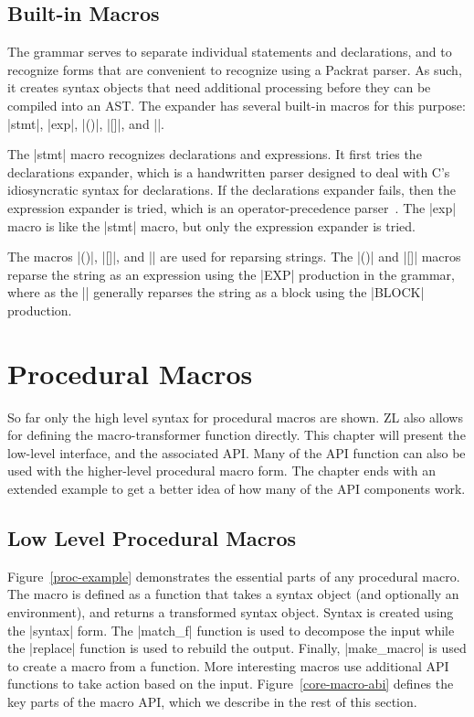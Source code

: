 \section{Built-in Macros}
\label{built-in}

The grammar serves to separate individual statements and declarations,
and to recognize forms that are convenient to recognize using a
Packrat parser.  As such, it creates syntax objects that need
additional processing before they can be compiled into an AST.  The
expander has several built-in macros for this purpose: |stmt|,
|exp|, |()|, |[]|, and |{}|.

The |stmt| macro recognizes declarations and expressions.  It first tries the
declarations expander, which is a handwritten parser designed to
deal with C's idiosyncratic syntax for declarations.  If the
declarations expander fails, then the expression expander is tried,
which is an operator-precedence parser~\cite{opp}.  
The |exp| macro is like the |stmt| macro, but only the expression
expander is tried.

The macros |()|, |[]|, and |{}| are used for reparsing
strings.  The |()| and |[]| macros reparse the string as an
expression using the |EXP| production in the grammar, where as the
|{}| generally reparses the string as a block using the |BLOCK|
production.

\chapter{Procedural Macros}
\label{proc-macros}

So far only the high level syntax for procedural macros are shown.  ZL
also allows for defining the macro-transformer function directly.
This chapter will present the low-level interface, and the associated
API.  Many of the API function can also be used with the higher-level
procedural macro form.  The chapter ends with an extended example to
get a better idea of how many of the API components work.

\section{Low Level Procedural Macros}
\label{low-level-proc}

Figure~\ref{proc-example} demonstrates the essential parts of any
procedural macro.  The macro is defined as a function that takes a
syntax object (and optionally an environment), and returns a
transformed syntax object.  Syntax is created using the |syntax| form.
The |match_f| function is used to decompose the input while the
|replace| function is used to rebuild the output.  Finally,
|make_macro| is used to create a macro from a function.  More
interesting macros use additional API functions to take action based
on the input.  Figure~\ref{core-macro-abi} defines the key parts of
the macro API, which we describe in the rest of this section.

